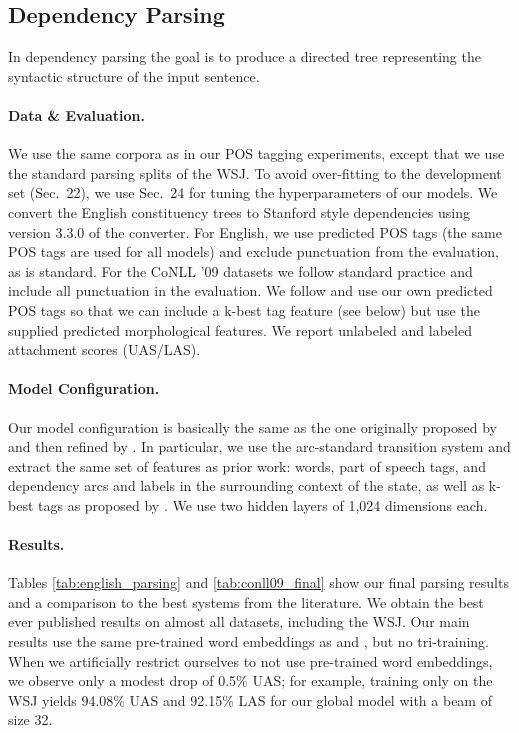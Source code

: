 \documentclass[11pt]{article}
\begin{document}
\subsection{Dependency Parsing}

In dependency parsing the goal is to produce a directed tree representing
the syntactic structure of the input sentence.

\paragraph{Data \& Evaluation.}

We use the same corpora as in our POS tagging experiments, except that we use
the standard parsing splits of the WSJ. To avoid over-fitting to the development
set (Sec.~22), we use Sec.~24 for tuning the hyperparameters of our models.
We convert the English constituency trees to Stanford style dependencies
\cite{stanford_dependencies} using version 3.3.0 of the converter.
For English, we use predicted POS tags (the same POS tags are used for
all models) and exclude punctuation from the evaluation, as is standard.
For the CoNLL '09 datasets
we follow standard practice and include all punctuation in the evaluation.
We follow  and 
use our own predicted POS tags so that we can include a k-best tag
feature (see below) but use the supplied predicted morphological features.
We report unlabeled and labeled attachment scores (UAS/LAS).

\paragraph{Model Configuration.}

Our model configuration is basically the same as the one originally proposed
by  and then refined by
. 
In particular, we use the arc-standard
transition system and extract the same set of features
as prior work: words, part of speech tags, and
dependency arcs and labels in the surrounding context of the state, 
as well as k-best tags as proposed by .
We use two hidden layers of 1,024 dimensions each.

\paragraph{Results.}

Tables \ref{tab:english_parsing} and \ref{tab:conll09_final} show
our final parsing results and a comparison to the best systems from the literature.
We obtain the best ever published results on almost all datasets, including the WSJ.
Our main results use the same pre-trained word embeddings
as  and , but no tri-training.
When we artificially restrict ourselves to not use pre-trained word embeddings, 
we observe only a modest drop of 0.5\% UAS;
for example, training only on the WSJ yields 94.08\% UAS and 92.15\% LAS 
for our global model with a beam of size 32.
\end{document}

